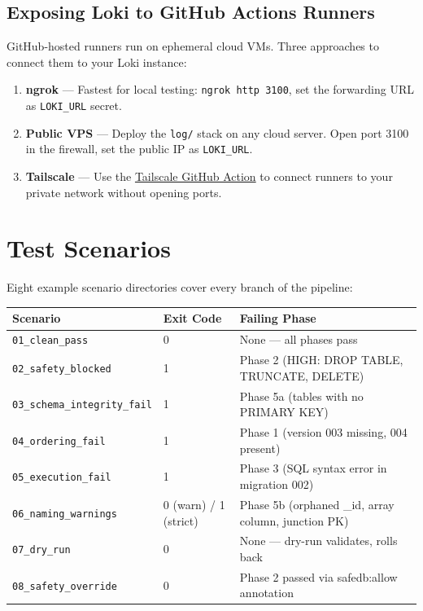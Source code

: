 \documentclass[12pt,a4paper]{report}
\begin{document}
\section{Exposing Loki to GitHub Actions Runners}

GitHub-hosted runners run on ephemeral cloud VMs. Three approaches to connect them
to your Loki instance:

\begin{enumerate}
  \item \textbf{ngrok} — Fastest for local testing:
        \texttt{ngrok http 3100}, set the forwarding URL as \texttt{LOKI\_URL} secret.
  \item \textbf{Public VPS} — Deploy the \texttt{log/} stack on any cloud server.
        Open port 3100 in the firewall, set the public IP as \texttt{LOKI\_URL}.
  \item \textbf{Tailscale} — Use the
        \href{https://github.com/tailscale/github-action}{Tailscale GitHub Action}
        to connect runners to your private network without opening ports.
\end{enumerate}

\chapter{Test Scenarios}

Eight example scenario directories cover every branch of the pipeline:

\begin{longtable}{@{}p{5cm}p{3cm}p{5cm}@{}}
\toprule
\textbf{Scenario} & \textbf{Exit Code} & \textbf{Failing Phase} \\
\midrule
\endhead
\texttt{01\_clean\_pass}         & 0 & None — all phases pass \\
\texttt{02\_safety\_blocked}     & 1 & Phase 2 (HIGH: DROP TABLE, TRUNCATE, DELETE) \\
\texttt{03\_schema\_integrity\_fail} & 1 & Phase 5a (tables with no PRIMARY KEY) \\
\texttt{04\_ordering\_fail}      & 1 & Phase 1 (version 003 missing, 004 present) \\
\texttt{05\_execution\_fail}     & 1 & Phase 3 (SQL syntax error in migration 002) \\
\texttt{06\_naming\_warnings}    & 0 (warn) / 1 (strict) & Phase 5b (orphaned \_id, array column, junction PK) \\
\texttt{07\_dry\_run}            & 0 & None — dry-run validates, rolls back \\
\texttt{08\_safety\_override}    & 0 & Phase 2 passed via safedb:allow annotation \\
\bottomrule
\end{longtable}
\end{document}
